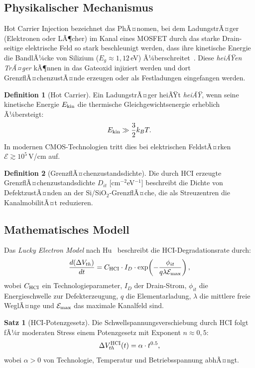 ﻿\documentclass[a4paper,12pt]{article}
\theoremstyle{definition}
\newtheorem{definition}{Definition}
\newtheorem{satz}{Satz}
\begin{document}
\subsection{Physikalischer Mechanismus}

Hot Carrier Injection bezeichnet das PhÃ¤nomen, bei dem LadungstrÃ¤ger (Elektronen
oder LÃ¶cher) im Kanal eines MOSFET durch das starke Drain-seitige elektrische Feld
so stark beschleunigt werden, dass ihre kinetische Energie die BandlÃ¼cke von Silizium
($E_g \approx 1{,}12$\,eV) Ã¼berschreitet~\cite{takeda1983,hu1985}. Diese
\emph{heiÃŸen TrÃ¤ger} kÃ¶nnen in das Gateoxid injiziert werden und dort
GrenzflÃ¤chenzustÃ¤nde erzeugen oder als Festladungen eingefangen werden.

\begin{definition}[Hot Carrier]
	Ein LadungstrÃ¤ger heiÃŸt \emph{heiÃŸ}, wenn seine kinetische Energie
	$E_{\rm kin}$ die thermische Gleichgewichtsenergie erheblich Ã¼bersteigt:
	\[
	E_{\rm kin} \gg \frac{3}{2} k_B T.
	\]
	In modernen CMOS-Technologien tritt dies bei elektrischen FeldstÃ¤rken
	$\mathcal{E} \gtrsim 10^5$\,V/cm auf.
\end{definition}

\begin{definition}[GrenzflÃ¤chenzustandsdichte]
	Die durch HCI erzeugte GrenzflÃ¤chenzustandsdichte $D_{it}$ [cm$^{-2}$eV$^{-1}$]
	beschreibt die Dichte von DefektzustÃ¤nden an der Si/SiO$_2$-GrenzflÃ¤che,
	die als Streuzentren die KanalmobilitÃ¤t reduzieren.
\end{definition}

\subsection{Mathematisches Modell}

Das \emph{Lucky Electron Model} nach Hu~\cite{hu1985} beschreibt die
HCI-Degradationsrate durch:
\[
\frac{d(\Delta V_{th})}{dt} = C_{\rm HCI} \cdot I_D \cdot
\exp\!\left(-\frac{\phi_{it}}{q\lambda \mathcal{E}_{\rm max}}\right),
\]
wobei $C_{\rm HCI}$ ein Technologieparameter, $I_D$ der Drain-Strom,
$\phi_{it}$ die Energieschwelle zur Defekterzeugung, $q$ die Elementarladung,
$\lambda$ die mittlere freie WeglÃ¤nge und $\mathcal{E}_{\rm max}$ das maximale
Kanalfeld sind.

\begin{satz}[HCI-Potenzgesetz]
	\label{satz:hci}
	Die Schwellspannungsverschiebung durch HCI folgt fÃ¼r moderaten Stress einem
	Potenzgesetz mit Exponent $n \approx 0{,}5$:
	\[
	\Delta V_{th}^{\rm HCI}(t) = \alpha \cdot t^{0.5},
	\]
	wobei $\alpha > 0$ von Technologie, Temperatur und Betriebsspannung abhÃ¤ngt.
\end{satz}
\end{document}

